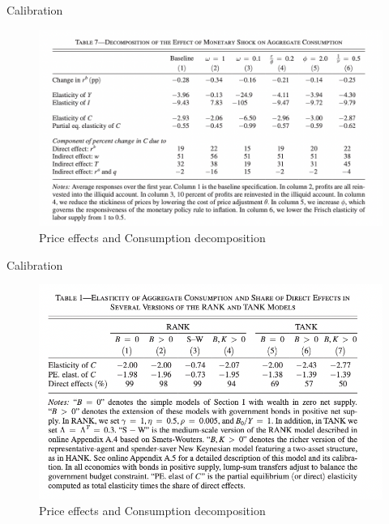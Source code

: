 \documentclass[english,xcolor=svgnames]{beamer}
\begin{document}
\begin{frame}{Calibration}
\begin{figure}
\includegraphics[scale=0.35]{figures/kmv_9}\\
Price effects and Consumption decomposition
\end{figure}
\end{frame}


\begin{frame}{Calibration}
\begin{figure}
\includegraphics[scale=0.35]{figures/kmv_10}\\
Price effects and Consumption decomposition
\end{figure}
\end{frame}
\end{document}
